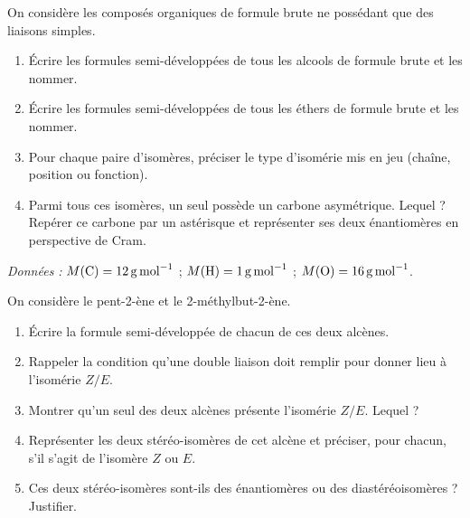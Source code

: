 \documentclass[11pt]{article}
\newcounter{popsec}
\newcounter{popsub}
\newcommand{\courssub}[1]{%
  \stepcounter{popsub}%
  \par\vspace{9pt}\noindent{\popxbold\fontsize{11.5}{13}\selectfont\color{popink}{\color{poporange}\thepopsec.\thepopsub}\hspace{6pt}#1}\par\nopagebreak\vspace{4pt}
}
\begin{document}
\courssub{Je m'entraîne}

\begin{exercice}
On considère les composés organiques de formule brute  ne possédant que des liaisons simples.
\begin{enumerate}
\item Écrire les formules semi-développées de tous les alcools de formule brute  et les nommer.
\item Écrire les formules semi-développées de tous les éthers de formule brute  et les nommer.
\item Pour chaque paire d'isomères, préciser le type d'isomérie mis en jeu (chaîne, position ou fonction).
\item Parmi tous ces isomères, un seul possède un carbone asymétrique. Lequel ? Repérer ce carbone par un astérisque et représenter ses deux énantiomères en perspective de Cram.
\end{enumerate}
\emph{Données :} $M(\ce{C}) = \SI{12}{g.mol^{-1}}$ ; $M(\ce{H}) = \SI{1}{g.mol^{-1}}$ ; $M(\ce{O}) = \SI{16}{g.mol^{-1}}$.
\end{exercice}

\begin{exercice}
On considère le pent-2-ène et le 2-méthylbut-2-ène.
\begin{enumerate}
\item Écrire la formule semi-développée de chacun de ces deux alcènes.
\item Rappeler la condition qu'une double liaison  doit remplir pour donner lieu à l'isomérie $Z/E$.
\item Montrer qu'un seul des deux alcènes présente l'isomérie $Z/E$. Lequel ?
\item Représenter les deux stéréo-isomères de cet alcène et préciser, pour chacun, s'il s'agit de l'isomère $Z$ ou $E$.
\item Ces deux stéréo-isomères sont-ils des énantiomères ou des diastéréoisomères ? Justifier.
\end{enumerate}
\end{exercice}
\end{document}
